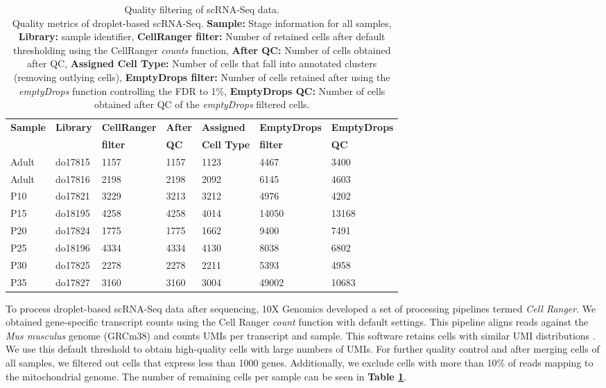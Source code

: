 \begin{table}[ht]
\centering
\caption[Quality filtering of scRNA-Seq data.]{Quality filtering of scRNA-Seq data. \\
Quality metrics of droplet-based scRNA-Seq. \textbf{Sample:} Stage information for all samples, 
\textbf{Library:} sample identifier, 
\textbf{CellRanger filter:} Number of retained cells after default thresholding using the CellRanger \emph{counts} function,  
\textbf{After QC:} Number of cells obtained after \gls{QC}, \textbf{Assigned Cell Type:} Number of cells that fall into annotated clusters (removing outlying cells), 
\textbf{EmptyDrops filter:} Number of cells retained after using the \emph{emptyDrops} function controlling the FDR to 1\%, 
\textbf{EmptyDrops QC:} Number of cells obtained after QC of the \emph{emptyDrops} filtered cells.
}
\label{tab3:QC_scRNAseq}
\begin{tabular}{lllllll}
\toprule
\textbf{Sample} & \textbf{Library} & \textbf{CellRanger} & \textbf{After} & \textbf{Assigned} & \textbf{EmptyDrops} & \textbf{EmptyDrops} \\
& & \textbf{filter} & \textbf{QC} & \textbf{Cell Type} & \textbf{filter} & \textbf{QC} \\
\midrule
Adult & do17815 & 1157 & 1157 & 1123 & 4467 & 3400 \\
\midrule
Adult & do17816 & 2198 & 2198 & 2092 & 6145 & 4603 \\
\midrule
P10 & do17821 & 3229 & 3213 & 3212 & 4976 & 4202 \\
\midrule
P15 & do18195 & 4258 & 4258 & 4014 & 14050 & 13168 \\
\midrule
P20 & do17824 & 1775 & 1775 & 1662 & 9400 & 7491 \\
\midrule
P25 & do18196 & 4334 & 4334 & 4130 & 8038 & 6802 \\
\midrule
P30 & do17825 & 2278 & 2278 & 2211 & 5393 & 4958 \\
\midrule
P35 & do17827 & 3160 & 3160 & 3004 & 49002 & 10683 \\                 
\bottomrule   
\end{tabular}
\end{table}

To process droplet-based scRNA-Seq data after sequencing, 10X Genomics\texttrademark{} developed a set of processing pipelines termed \textit{Cell Ranger}. 
We obtained gene-specific transcript counts using the Cell Ranger \emph{count} function with default settings. 
This pipeline aligns reads against the \emph{Mus musculus} genome (GRCm38) and counts UMIs per transcript and sample. 
This software retains cells with similar UMI distributions \citep{Zheng2017}. 
We use this default threshold to obtain high-quality cells with large numbers of UMIs. 
For further quality control and after merging cells of all samples, we filtered out cells that express less than 1000 genes. 
Additionally, we exclude cells with more than 10\% of reads mapping to the mitochondrial genome. 
The number of remaining cells per sample can be seen in \textbf{Table \ref{tab3:QC_scRNAseq}}.\\

